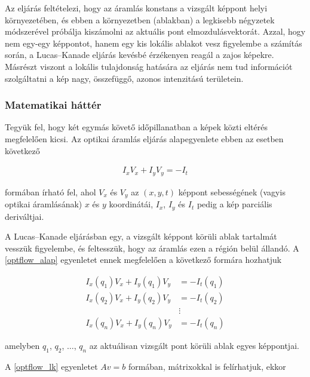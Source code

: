 Az eljárás feltételezi, hogy az áramlás konstans a vizsgált képpont helyi környezetében, és ebben a környezetben (ablakban) a legkisebb négyzetek módszerével próbálja kiszámolni az aktuális pont elmozdulásvektorát. Azzal, hogy nem egy-egy képpontot, hanem egy kis lokális ablakot vesz figyelembe a számítás során, a Lucas--Kanade eljárás kevésbé érzékenyen reagál a zajos képekre. Másrészt viszont a lokális tulajdonság hatására az eljárás nem tud információt szolgáltatni a kép nagy, összefüggő, azonos intenzitású területein.

\subsubsection{Matematikai háttér}\label{sect:matrixok}

Tegyük fel, hogy két egymás követő időpillanatban a képek közti eltérés megfelelően kicsi. Az optikai áramlás eljárás alapegyenlete ebben az esetben következő

\begin{align}\label{eq:optflow_alap}
I_x V_x + I_y V_y = - I_t
\end{align}

formában írható fel, ahol $V_x$ és $V_y$ az $(x,y,t)$ képpont sebességének (vagyis optikai áramlásának) $x$ és $y$ koordinátái, $I_x$, $I_y$ és $I_t$ pedig a kép parciális deriváltjai.

A Lucas--Kanade eljárásban egy, a vizsgált képpont körüli ablak tartalmát vesszük figyelembe, és feltesszük, hogy az áramlás ezen a régión belül állandó. A \eqref{optflow_alap} egyenletet ennek megfelelően a következő formára hozhatjuk

\begin{align}\label{eq:optflow_lk}
I_x(q_1)V_x + I_y(q_1)V_y &= - I_t(q_1) \nonumber \\
I_x(q_2)V_x + I_y(q_2)V_y &= - I_t(q_2) \nonumber \\
&\vdots \nonumber \\
I_x(q_n)V_x + I_y(q_n)V_y &= - I_t(q_n)
\end{align}

amelyben $q_1$, $q_2$, $\ldots$, $q_n$ az aktuálisan vizsgált pont körüli ablak egyes képpontjai.

A \eqref{optflow_lk} egyenletet $Av = b$ formában, mátrixokkal is felírhatjuk, ekkor 

